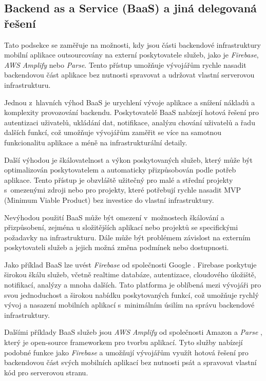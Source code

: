 \subsection{Backend as a Service (BaaS) a jiná delegovaná řešení}\label{baas}

Tato podsekce se zaměřuje na možnosti, kdy jsou části backendové infrastruktury mobilní aplikace outsourcovány na externí poskytovatele služeb, jako je \emph{Firebase}, \emph{AWS Amplify} nebo \emph{Parse}. Tento přístup umožňuje vývojářům rychle nasadit backendovou část aplikace bez nutnosti spravovat a udržovat vlastní serverovou infrastrukturu.

Jednou z~hlavních výhod BaaS je urychlení vývoje aplikace a snížení nákladů a komplexity provozování backendu. Poskytovatelé BaaS nabízejí hotová řešení pro autentizaci uživatelů, ukládání dat, notifikace, analýzu chování uživatelů a řadu dalších funkcí, což umožňuje vývojářům zaměřit se více na samotnou funkcionalitu aplikace a méně na infrastrukturální detaily.

Další výhodou je škálovatelnost a výkon poskytovaných služeb, který může být optimalizován poskytovatelem a automaticky přizpůsobován podle potřeb aplikace. Tento přístup je obzvláště užitečný pro malé a střední projekty s~omezenými zdroji nebo pro projekty, které potřebují rychle nasadit MVP (Minimum Viable Product) bez investice do vlastní infrastruktury.

Nevýhodou použití BaaS může být omezení v~možnostech škálování a přizpůsobení, zejména u složitějších aplikací nebo projektů se specifickými požadavky na infrastrukturu. Dále může být problémem závislost na externím poskytovateli služeb a jejich možná změna podmínek nebo dostupnosti.

Jako příklad BaaS lze uvést \emph{Firebase} od společnosti Google \cite{firebase}. Firebase poskytuje širokou škálu služeb, včetně realtime databáze, autentizace, cloudového úložiště, notifikací, analýzy a mnoha dalších. Tato platforma je oblíbená mezi vývojáři pro svou jednoduchost a širokou nabídku poskytovaných funkcí, což umožňuje rychlý vývoj a nasazení mobilních aplikací s~minimálním úsilím na správu backendové infrastruktury.

Dalšími příklady BaaS služeb jsou \emph{AWS Amplify} od společnosti Amazon \cite{aws-amplify} a \emph{Parse} \cite{parse}, který je open-source frameworkem pro tvorbu aplikací. Tyto služby nabízejí podobné funkce jako \emph{Firebase} a umožňují vývojářům využít hotová řešení pro backendovou část svých mobilních aplikací bez nutnosti psát a spravovat vlastní kód pro serverovou stranu.

